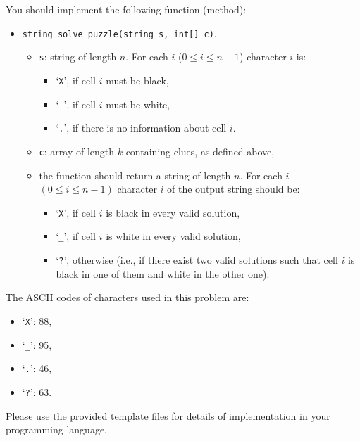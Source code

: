 You should implement the following function (method):
\begin{itemize}
\item \texttt{string solve\_puzzle(string s, int[] c)}. 
	\begin{itemize}
    \item \texttt{s}: string of length $n$. For each $i$ ($0 \leq i \leq n - 1$) character $i$ is:
	\begin{itemize}
		\item `\texttt{X}', if cell $i$ must be black,
		\item `\texttt{\_}', if cell $i$ must be white,
		\item `\texttt{.}', if there is no information about cell $i$.
	\end{itemize}
	\item \texttt{c}: array of length $k$ containing clues, as defined above,
	\item the function should return a string of length $n$. For each $i$ $(0 \le i \le n - 1)$ character $i$ of the output string should be:
	\begin{itemize}    
		\item `\texttt{X}', if cell $i$ is black in every valid solution,
		\item `\texttt{\_}', if cell $i$ is white in every valid solution,
		\item `\texttt{?}', otherwise (i.e., if there exist two valid solutions such that cell $i$ is black in one of
        them and white in the other one).
    \end{itemize}
\end{itemize}
\end{itemize}

The ASCII codes of characters used in this problem are:
\begin{itemize}
\item `\texttt{X}': 88,
\item `\texttt{\_}': 95,
\item `\texttt{.}': 46,
\item `\texttt{?}': 63.
\end{itemize}

Please use the provided template files for details of implementation in your programming language.
